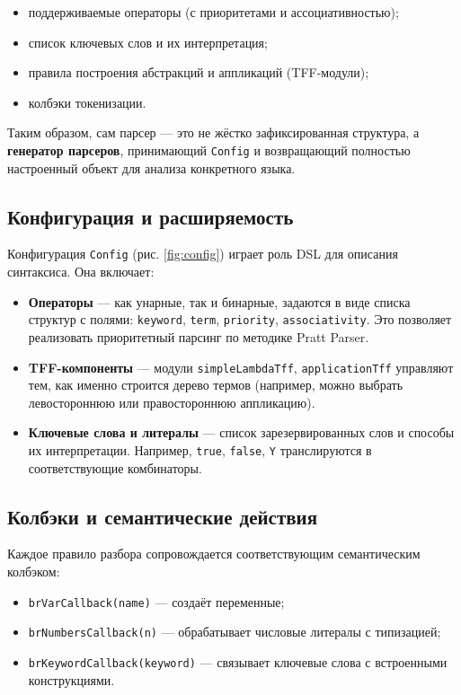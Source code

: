 \begin{itemize}
  \item поддерживаемые операторы (с приоритетами и ассоциативностью);
  \item список ключевых слов и их интерпретация;
  \item правила построения абстракций и аппликаций (TFF-модули);
  \item колбэки токенизации.
\end{itemize}

Таким образом, сам парсер — это не жёстко зафиксированная структура, а \textbf{генератор парсеров}, принимающий \texttt{Config} и возвращающий полностью настроенный объект для анализа конкретного языка.

\subsection{Конфигурация и расширяемость}

Конфигурация \texttt{Config} (рис. \ref{fig:config}) играет роль DSL для описания синтаксиса. Она включает:

\begin{itemize}
  \item \textbf{Операторы} — как унарные, так и бинарные, задаются в виде списка структур с полями: \texttt{keyword}, \texttt{term}, \texttt{priority}, \texttt{associativity}. Это позволяет реализовать приоритетный парсинг по методике Pratt Parser.
  \item \textbf{TFF-компоненты} — модули \texttt{simpleLambdaTff}, \texttt{applicationTff} управляют тем, как именно строится дерево термов (например, можно выбрать левостороннюю или правостороннюю аппликацию).
  \item \textbf{Ключевые слова и литералы} — список зарезервированных слов и способы их интерпретации. Например, \texttt{true}, \texttt{false}, \texttt{Y} транслируются в соответствующие комбинаторы.
\end{itemize}

\subsection{Колбэки и семантические действия}

Каждое правило разбора сопровождается соответствующим семантическим колбэком:

\begin{itemize}
  \item \texttt{brVarCallback(name)} — создаёт переменные;
  \item \texttt{brNumbersCallback(n)} — обрабатывает числовые литералы с типизацией;
  \item \texttt{brKeywordCallback(keyword)} — связывает ключевые слова с встроенными конструкциями.
\end{itemize}

